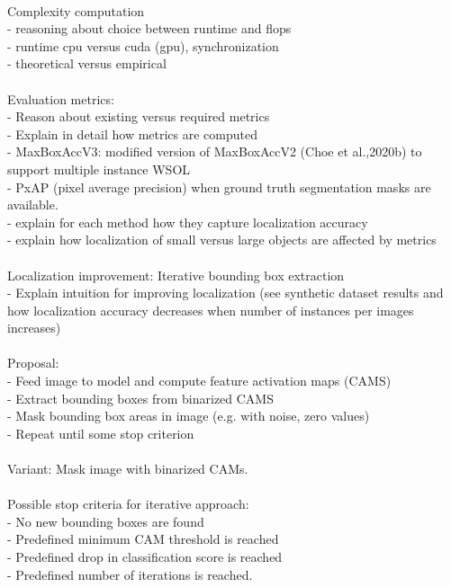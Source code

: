 \\
Complexity computation\\
- reasoning about choice between runtime and flops\\
- runtime cpu versus cuda (gpu), synchronization\\
- theoretical versus empirical\\
\\
Evaluation metrics:\\
- Reason about existing versus required metrics\\
- Explain in detail how metrics are computed\\
- MaxBoxAccV3: modified version of MaxBoxAccV2 (Choe et al.,2020b) to support multiple instance WSOL\\
- PxAP (pixel average precision) when ground truth segmentation masks are available.\\
- explain for each method how they capture localization accuracy\\
- explain how localization of small versus large objects are affected by metrics\\
\\
Localization improvement: Iterative bounding box extraction\\
- Explain intuition for improving localization (see synthetic dataset results and how localization accuracy decreases when number of instances per images increases)\\
\\
Proposal:\\
- Feed image to model and compute feature activation maps (CAMS)\\
- Extract bounding boxes from binarized CAMS\\
- Mask bounding box areas in image (e.g. with noise, zero values) \\
- Repeat until some stop criterion\\
\\
Variant: Mask image with binarized CAMs.\\
\\
Possible stop criteria for iterative approach:\\
- No new bounding boxes are found\\
- Predefined minimum CAM threshold is reached\\
- Predefined drop in classification score is reached\\
- Predefined number of iterations is reached.\\


